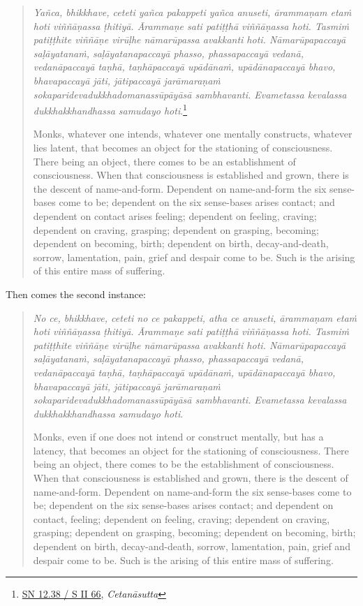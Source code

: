 \begin{quote}
\emph{Yañca, bhikkhave, ceteti yañca pakappeti yañca anuseti, ārammaṇam etaṁ hoti viññāṇassa ṭhitiyā. Ārammaṇe sati patiṭṭhā viññāṇassa hoti. Tasmiṁ patiṭṭhite viññāṇe virūḷhe nāmarūpassa avakkanti hoti. Nāmarūpapaccayā saḷāyatanaṁ, saḷāyatanapaccayā phasso, phassapaccayā vedanā, vedanāpaccayā taṇhā, taṇhāpaccayā upādānaṁ, upādānapaccayā bhavo, bhavapaccayā jāti, jātipaccayā jarāmaraṇaṁ sokaparidevadukkhadomanassūpāyāsā sambhavanti. Evametassa kevalassa dukkhakkhandhassa samudayo hoti}.\footnote{\href{https://suttacentral.net/sn12.38/pli/ms}{SN 12.38 / S II 66}, \emph{Cetanāsutta}}

Monks, whatever one intends, whatever one mentally constructs, whatever lies latent, that becomes an object for the stationing of consciousness. There being an object, there comes to be an establishment of consciousness. When that consciousness is established and grown, there is the descent of name-and-form. Dependent on name-and-form the six sense-bases come to be; dependent on the six sense-bases arises contact; and dependent on contact arises feeling; dependent on feeling, craving; dependent on craving, grasping; dependent on grasping, becoming; dependent on becoming, birth; dependent on birth, decay-and-death, sorrow, lamentation, pain, grief and despair come to be. Such is the arising of this entire mass of suffering.
\end{quote}

Then comes the second instance:

\begin{quote}
\emph{No ce, bhikkhave, ceteti no ce pakappeti, atha ce anuseti, ārammaṇam etaṁ hoti viññāṇassa ṭhitiyā. Ārammaṇe sati patiṭṭhā viññāṇassa hoti. Tasmiṁ patiṭṭhite viññāṇe virūḷhe nāmarūpassa avakkanti hoti. Nāmarūpapaccayā saḷāyatanaṁ, saḷāyatanapaccayā phasso, phassapaccayā vedanā, vedanāpaccayā taṇhā, taṇhāpaccayā upādānaṁ, upādānapaccayā bhavo, bhavapaccayā jāti, jātipaccayā jarāmaraṇaṁ sokaparidevadukkhadomanassūpāyāsā sambhavanti. Evametassa kevalassa dukkhakkhandhassa samudayo hoti}.

Monks, even if one does not intend or construct mentally, but has a latency, that becomes an object for the stationing of consciousness. There being an object, there comes to be the establishment of consciousness. When that consciousness is established and grown, there is the descent of name-and-form. Dependent on name-and-form the six sense-bases come to be; dependent on the six sense-bases arises contact; and dependent on contact, feeling; dependent on feeling, craving; dependent on craving, grasping; dependent on grasping, becoming; dependent on becoming, birth; dependent on birth, decay-and-death, sorrow, lamentation, pain, grief and despair come to be. Such is the arising of this entire mass of suffering.
\end{quote}

